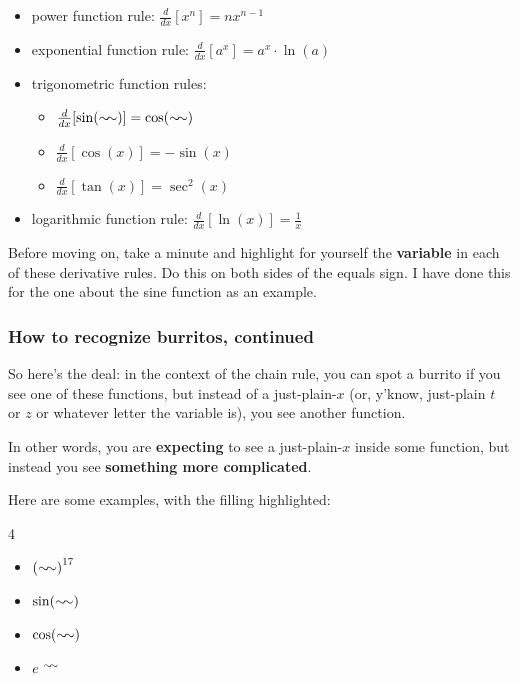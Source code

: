 \begin{minipage}{0.55\textwidth}
    \everymath{\displaystyle}
    \newcommand{\x}{\blue{x}}
    \newcommand{\diff}[1]{\frac{d}{d#1}}
    \begin{itemize}[label=\(\square\)]
        \item power function rule: $\diff{x}[x^n] = nx^{n-1}$
        \item exponential function rule: $\diff{x}[a^x] = a^x\cdot\ln(a)$
        \item[] trigonometric function rules: 
        \begin{itemize}[label=\(\bigcirc\)]
            \item $\diff{x}[\sin(\x)] = \cos(\x)$
            \item $\diff{x}[\cos(x)] = -\sin(x)$
            \item $\diff{x}[\tan(x)] = \sec^2(x)$
        \end{itemize}
        \item logarithmic function rule: $\diff{x}[\ln(x)] = \frac{1}{x}$
    \end{itemize}
\end{minipage}
\begin{minipage}{0.45\textwidth}
Before moving on, take a minute and highlight for yourself the \textbf{variable} in each of these derivative rules. Do this on both sides of the equals sign. I have done this for the one about the sine function as an example.
\end{minipage}

\pagebreak

\subsubsection*{How to recognize burritos, continued}

So here's the deal: in the context of the chain rule, you can spot a burrito if you see one of these functions, but instead of a just-plain-$x$ (or, y'know, just-plain $t$ or $z$ or whatever letter the variable is), you see another function.

In other words, you are \textbf{expecting} to see a just-plain-$x$ inside some function, but instead you see \textbf{something more complicated}.

Here are some examples, with the filling highlighted:

\begin{multicols}{4}
    \begin{itemize}
        \item $\left(\blue{4z^3+77}\right)^{17}$
        \item $\sin(\blue{7t})$
        \item $\cos(\blue{\ln(q)})$
        \item $e^{\ \blue{\scriptstyle{2x+6}}}$
    \end{itemize}
\end{multicols}

